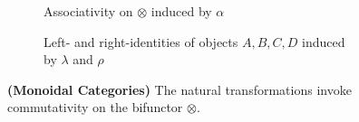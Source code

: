 \documentclass[10pt,a4paper,reqno]{amsart}
\numberwithin{equation}{section}
\numberwithin{figure}{section}
\begin{document}
\begin{figure}[ht]
        \begin{subfigure}{\textwidth}
                \centering
                \caption{Associativity on $\otimes$ induced by $\alpha$}
        \end{subfigure}

        \begin{subfigure}{\textwidth}
                \centering
                \caption{Left- and right-identities of objects $A,B,C,D$ induced
                        by $\lambda$ and $\rho$}
        \end{subfigure}%
        \caption{\textbf{(Monoidal Categories)} The natural transformations
                invoke commutativity on the bifunctor $\otimes$.}
        \vspace{1.5em}
        \label{fig:monoidal-cat-commute}
\end{figure}
\end{document}
